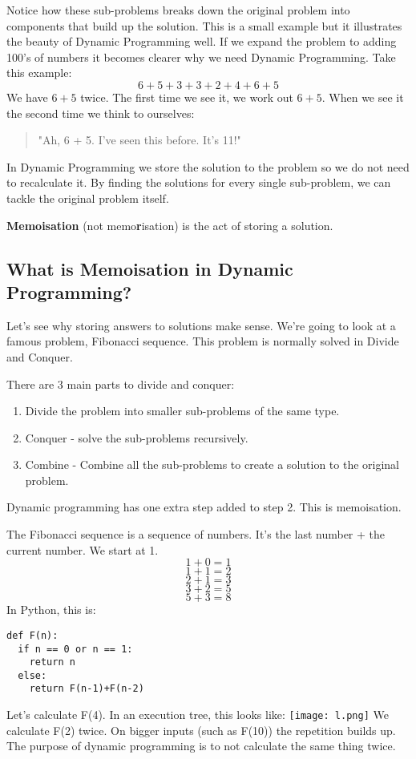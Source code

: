 \documentclass{article}
\begin{document}
Notice how these sub-problems breaks down the original problem into components that build up the solution. This is a small example but it illustrates the beauty of Dynamic Programming well. If we expand the problem to adding 100's of numbers it becomes clearer why we need Dynamic Programming. Take this example:
$$6 + 5 + 3 + 3 + 2 + 4 + 6 + 5$$
We have $6 + 5$ twice. The first time we see it, we work out $6 + 5$. When we see it the second time we think to ourselves:
\begin{quote}
    "Ah, 6 + 5. I've seen this before. It's 11!"
\end{quote}
In Dynamic Programming we store the solution to the problem so we do not need to recalculate it. By finding the solutions for every single sub-problem, we can tackle the original problem itself.

\textbf{Memoisation} (not memo\textbf{r}isation) is the act of storing a solution.
\newpage
\subsection{What is Memoisation in Dynamic Programming?}
Let's see why storing answers to solutions make sense. We're going to look at a famous problem, Fibonacci sequence. This problem is normally solved in Divide and Conquer. 

There are 3 main parts to divide and conquer:
\begin{enumerate}
    \item Divide the problem into smaller sub-problems of the same type.
    \item Conquer - solve the sub-problems recursively.
    \item Combine - Combine all the sub-problems to create a solution to the original problem.
\end{enumerate}
Dynamic programming has one extra step added to step 2. This is memoisation. 

The Fibonacci sequence is a sequence of numbers. It's the last number + the current number. We start at 1. 
$$1 + 0 = 1$$
$$1 + 1 = 2$$
$$2 + 1 = 3$$
$$3 + 2 = 5$$
$$5 + 3 = 8$$
In Python, this is:
\begin{verbatim}
def F(n):
  if n == 0 or n == 1:
	return n
  else:
	return F(n-1)+F(n-2)
\end{verbatim}
Let's calculate F(4). In an execution tree, this looks like:
 \texttt{[image: l.png]}
 We calculate F(2) twice. On bigger inputs (such as F(10)) the repetition builds up. The purpose of dynamic programming is to not calculate the same thing twice.
 
\end{document}
